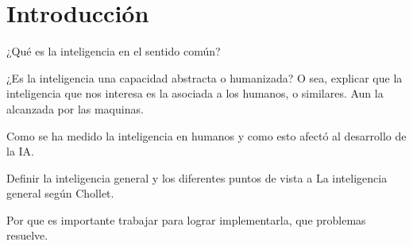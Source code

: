 \chapter*{Introducción}\label{chapter:introduction}

¿Qué es la inteligencia en el sentido común?

¿Es la inteligencia una capacidad abstracta o humanizada? O sea, explicar que la inteligencia que nos interesa es la asociada a los humanos, o similares. Aun la alcanzada por las maquinas.

Como se ha medido la inteligencia en humanos y como esto afectó al desarrollo de la IA.

Definir la inteligencia general y los diferentes puntos de vista
a
La inteligencia general según Chollet.

Por que es importante trabajar para lograr implementarla, que problemas resuelve.
